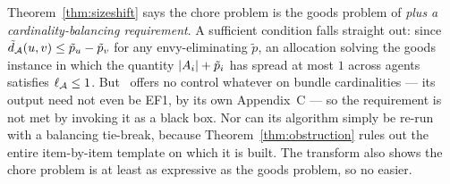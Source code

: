 \ifworking
\begin{remark}
\label{rem:notcorollary}
Theorem~\ref{thm:sizeshift} says the chore problem is the goods problem of
\cite{BKNS22} \emph{plus a cardinality-balancing requirement}. A sufficient
condition falls straight out: since $\tilde{d}_{\mathcal{A}}(u,v) \le \tilde{p}_u -
\tilde{p}_v$ for any envy-eliminating $\tilde{p}$, an allocation solving the
goods instance in which the quantity $\left\lvert A_{i}\right\rvert + \tilde{p}_i$ has spread
at most $1$ across agents satisfies $\ell_{\mathcal{A}} \le 1$. But~\cite{BKNS22}
offers no control whatever on bundle cardinalities --- its output need not even
be EF1, by its own Appendix~C --- so the requirement is not met by invoking it
as a black box.
\ifworking
Nor can its algorithm simply be re-run with a balancing tie-break, because
Theorem~\ref{thm:obstruction} rules out the entire item-by-item template on
which it is built.
\fi
The transform also shows the chore problem is at least as expressive as the
goods problem, so no easier.
\end{remark}
\fi
